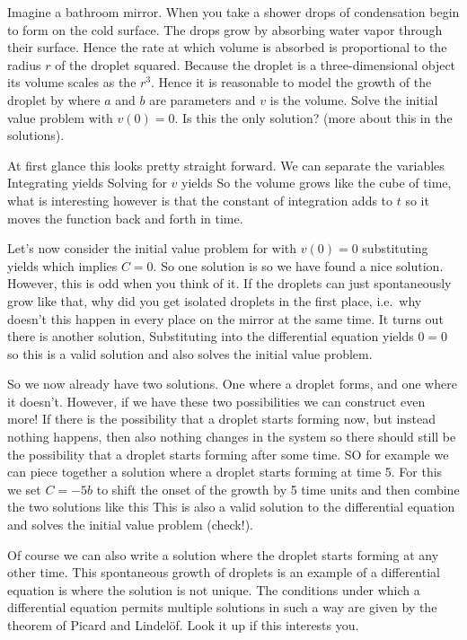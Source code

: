 \label{exGrowthCondensation}Imagine a bathroom mirror. When you take a shower drops of condensation begin to form on the cold surface. The drops grow by absorbing water vapor through their surface. Hence the rate at which volume is absorbed is proportional to the radius $r$ of the droplet squared. Because the droplet is a three-dimensional object its volume scales as the $r^3$. Hence it is reasonable to model the growth of the droplet by    
where $a$ and $b$ are parameters and $v$ is the volume. Solve the initial value problem with $v(0)=0$. Is this the only solution? (more about this in the solutions).  

\solution 
At first glance this looks pretty straight forward. We can separate the variables
Integrating yields
Solving for $v$ yields 
So the volume grows like the cube of time, what is interesting however is that the constant of integration adds to $t$ so it moves the function back and forth in time. 

Let's now consider the initial value problem for with $v(0)=0$ substituting yields 
which implies $C=0$. So one solution is so we have found a nice solution. 
However, this is odd when you think of it. If the droplets can just spontaneously grow like that, why did you get isolated droplets in the first place, i.e.~why doesn't this happen in every place on the mirror at the same time. It turns out there is another solution, 
Substituting into the differential equation yields $0=0$ so this is a valid solution and also solves the initial value problem. 

So we now already have two solutions. One where a droplet forms, and one where it doesn't. However, if we have these two possibilities we can construct even more! If there is the possibility that a droplet starts forming now, but instead nothing happens, then also nothing changes in the system so there should still be the possibility that a droplet starts forming after some time.
SO for example we can piece together a solution where a droplet starts forming at time 5. For this we set $C=-5b$ to shift the onset of the growth by 5 time units and then combine the two solutions like this 
This is also a valid solution to the differential equation and solves the initial value problem (check!). 

Of course we can also write a solution where the droplet starts forming at any other time. This spontaneous growth of droplets is an example of a differential equation is where the solution is not unique. The conditions under which a differential equation permits multiple solutions in such a way are given by the theorem of Picard and Lindel\"of. Look it up if this interests you.   
